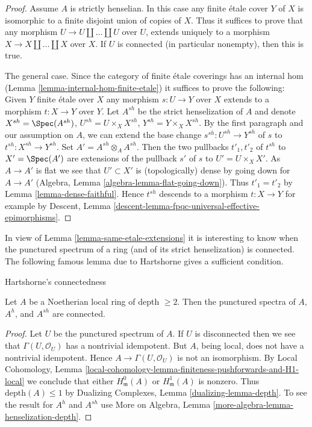 \begin{proof}
Assume $A$ is strictly henselian. In this case any finite \'etale
cover $Y$ of $X$ is isomorphic to a finite disjoint union of
copies of $X$. Thus it suffices to prove that any morphism
$U \to U \amalg \ldots \amalg U$ over $U$, extends uniquely to a morphism
$X \to X \amalg \ldots \amalg X$ over $X$.
If $U$ is connected (in particular nonempty), then this is true.

\medskip\noindent
The general case. Since the category of finite \'etale coverings has an
internal hom (Lemma \ref{lemma-internal-hom-finite-etale})
it suffices to prove the following: Given $Y$ finite \'etale over $X$
any morphism $s : U \to Y$ over $X$ extends to a morphism $t : X \to Y$
over $Y$. Let $A^{sh}$ be the strict henselization of $A$ and denote
$X^{sh} = \Spec(A^{sh})$, $U^{sh} = U \times_X X^{sh}$,
$Y^{sh} = Y \times_X X^{sh}$. By the first paragraph and our assumption
on $A$, we can extend the base change $s^{sh} : U^{sh} \to Y^{sh}$ of $s$ to
$t^{sh} : X^{sh} \to Y^{sh}$. Set $A' = A^{sh} \otimes_A A^{sh}$.
Then the two pullbacks $t'_1, t'_2$ of $t^{sh}$ to $X' = \Spec(A')$
are extensions of the pullback $s'$ of $s$ to $U' = U \times_X X'$.
As $A \to A'$ is flat we see that $U' \subset X'$ is (topologically) dense
by going down for $A \to A'$
(Algebra, Lemma \ref{algebra-lemma-flat-going-down}). Thus
$t'_1 = t'_2$ by Lemma \ref{lemma-dense-faithful}.
Hence $t^{sh}$ descends to a morphism $t : X \to Y$
for example by
Descent, Lemma \ref{descent-lemma-fpqc-universal-effective-epimorphisms}.
\end{proof}

\noindent
In view of Lemma \ref{lemma-same-etale-extensions}
it is interesting to know when the
punctured spectrum of a ring (and of its strict henselization)
is connected. The following famous lemma due to Hartshorne
gives a sufficient condition.

\begin{lemma}
\label{lemma-depth-2-connected-punctured-spectrum}
\begin{reference}
\cite[Proposition 2.1]{Hartshorne-connectedness}
\end{reference}
\begin{slogan}
Hartshorne's connectedness
\end{slogan}
Let $A$ be a Noetherian local ring of depth $\geq 2$.
Then the punctured spectra of $A$, $A^h$, and $A^{sh}$ are connected.
\end{lemma}

\begin{proof}
Let $U$ be the punctured spectrum of $A$.
If $U$ is disconnected then we see that
$\Gamma(U, \mathcal{O}_U)$ has a nontrivial idempotent.
But $A$, being local, does not have a nontrivial idempotent.
Hence $A \to \Gamma(U, \mathcal{O}_U)$ is not an isomorphism.
By Local Cohomology, Lemma
\ref{local-cohomology-lemma-finiteness-pushforwards-and-H1-local}
we conclude that either $H^0_\mathfrak m(A)$ or $H^1_\mathfrak m(A)$
is nonzero. Thus $\text{depth}(A) \leq 1$ by
Dualizing Complexes, Lemma \ref{dualizing-lemma-depth}.
To see the result for $A^h$ and $A^{sh}$ use
More on Algebra, Lemma \ref{more-algebra-lemma-henselization-depth}.
\end{proof}

